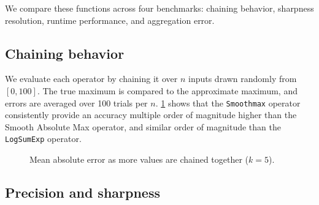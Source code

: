 We compare these functions across four benchmarks: chaining behavior, sharpness resolution, runtime performance, and aggregation error.

\subsection*{Chaining behavior}

We evaluate each operator by chaining it over $n$ inputs drawn randomly from $[0, 100]$. The true maximum is compared to the approximate maximum, and errors are averaged over 100 trials per $n$. \cref{fig:smoothmax-chained-error} shows that the \texttt{Smoothmax} operator consistently provide an accuracy multiple order of magnitude higher than the Smooth Absolute Max operator, and similar order of magnitude than the \texttt{LogSumExp} operator. 

\begin{figure}
    \caption[Mean absolute error as more values are chained together ($k = 5$)]{Mean absolute error as more values are chained together ($k = 5$).}
    \label{fig:smoothmax-chained-error}
\end{figure}


\subsection*{Precision and sharpness}

